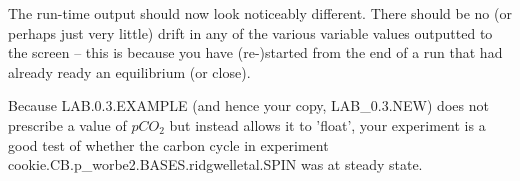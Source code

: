 The run-time output should now look noticeably different. There should be no (or perhaps just very little) drift in any of the various variable values outputted to the screen – this is because you have (re-)started from the end of a run that had already ready an equilibrium (or close).

Because \textsf{\footnotesize LAB.0.3.EXAMPLE} (and hence your copy, \textsf{\footnotesize LAB\_0.3.NEW}) does not prescribe a value of $pCO_2$ but instead allows it to 'float', your experiment is a good test of whether the carbon cycle in experiment \\\textsf{\footnotesize cookie.CB.p\_worbe2.BASES.ridgwelletal.SPIN} was at steady state.

